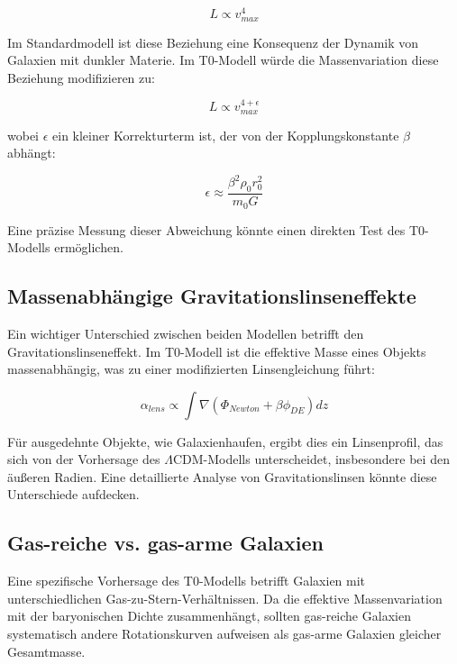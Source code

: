 \documentclass[a4paper,12pt]{article}
\begin{document}
\begin{equation}
	L \propto v_{max}^{4}
\end{equation}

Im Standardmodell ist diese Beziehung eine Konsequenz der Dynamik von Galaxien mit dunkler Materie. Im T0-Modell würde die Massenvariation diese Beziehung modifizieren zu:

\begin{equation}
	L \propto v_{max}^{4+\epsilon}
\end{equation}

wobei $\epsilon$ ein kleiner Korrekturterm ist, der von der Kopplungskonstante $\beta$ abhängt:

\begin{equation}
	\epsilon \approx \frac{\beta^2 \rho_0 r_0^2}{m_0 G}
\end{equation}

Eine präzise Messung dieser Abweichung könnte einen direkten Test des T0-Modells ermöglichen.

\subsection{Massenabhängige Gravitationslinseneffekte}

Ein wichtiger Unterschied zwischen beiden Modellen betrifft den Gravitationslinseneffekt. Im T0-Modell ist die effektive Masse eines Objekts massenabhängig, was zu einer modifizierten Linsengleichung führt:

\begin{equation}
	\alpha_{lens} \propto \int \nabla(\Phi_{Newton} + \beta\phi_{DE}) dz
\end{equation}

Für ausgedehnte Objekte, wie Galaxienhaufen, ergibt dies ein Linsenprofil, das sich von der Vorhersage des $\Lambda$CDM-Modells unterscheidet, insbesondere bei den äußeren Radien. Eine detaillierte Analyse von Gravitationslinsen könnte diese Unterschiede aufdecken.

\subsection{Gas-reiche vs. gas-arme Galaxien}

Eine spezifische Vorhersage des T0-Modells betrifft Galaxien mit unterschiedlichen Gas-zu-Stern-Verhältnissen. Da die effektive Massenvariation mit der baryonischen Dichte zusammenhängt, sollten gas-reiche Galaxien systematisch andere Rotationskurven aufweisen als gas-arme Galaxien gleicher Gesamtmasse.
\end{document}
